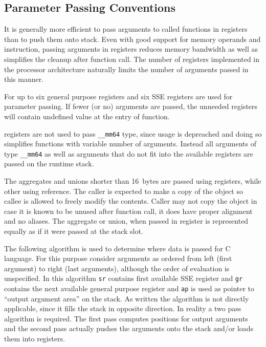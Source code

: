 \subsection{Parameter Passing Conventions}

It is generally more efficient to pass arguments to called functions in
registers than to push them onto stack. Even with good support for memory
operands and  instruction, passing arguments in registers reduces
memory bandwidth as well as simplifies the cleanup after function call.  The
number of registers implemented in the processor architecture naturally limits
the number of arguments passed in this manner.

For \xARCH up to six general purpose registers and six SSE registers are used
for parameter passing.  If fewer (or no) arguments are passed, the unneeded registers
will contain undefined value at the entry of function.

\MMX{} registers are not used to pass \verb|__mm64| type, since \MMX{}
usage is depreached and doing so simplifies functions with variable
number of arguments.  Instead all arguments of type \verb|__mm64| as
well as arguments that do not fit into the available registers are
passed on the runtime stack.

The aggregates and unions shorter than 16~bytes are passed using registers,
while other using reference.  The caller is expected to make a copy of the object
so callee is allowed to freely modify the contents.  Caller may not copy the
object in case it is known to be unused after function call, it does have
proper alignment and no aliases. The aggregate or union, when passed in register
is represented equally as if it were passed at the stack slot.

The following algorithm is used to determine where data is passed for
C language.  For this purpose consider arguments as ordered from left
(first argument) to right (last arguments), although the order of
evaluation is unspecified. In this algorithm \verb|sr| contains first
available SSE register and \verb|gr| contains the next available
general purpose register and \verb|ap| is used as pointer to ``output
argument area'' on the stack.  As written the algorithm is not
directly applicable, since it fills the stack in opposite direction.
In reality a two pass algorithm is required.  The first pass computes
positions for output arguments and the second pass actually pushes the
arguments onto the stack and/or loads them into registers.


